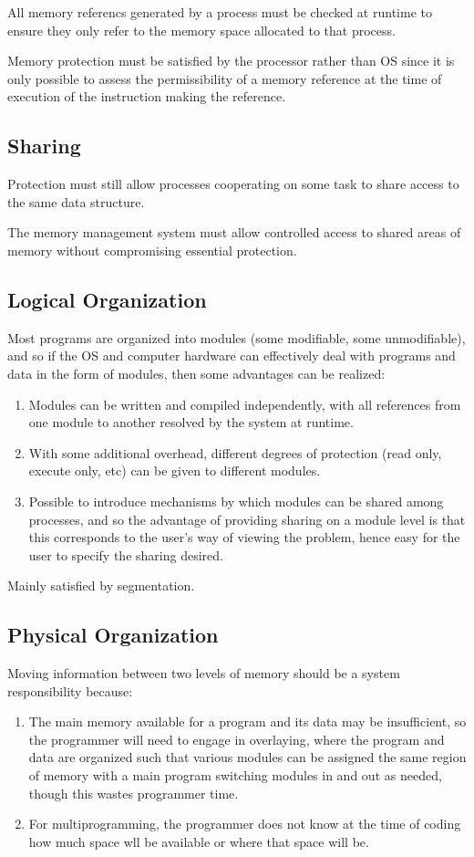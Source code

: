\documentclass[11pt]{article}
\begin{document}
All memory referencs generated by a process must be checked at runtime to ensure
they only refer to the memory space allocated to that process.

Memory protection must be satisfied by the processor rather than OS since it is
only possible to assess the permissibility of a memory reference at the time of
execution of the instruction making the reference.
\subsection{Sharing}
\label{sec:org9877cf6}
Protection must still allow processes cooperating on some task to share access to the
same data structure.

The memory management system must allow controlled access to shared areas of memory
without compromising essential protection.
\subsection{Logical Organization}
\label{sec:org0d402cc}
Most programs are organized into modules (some modifiable, some unmodifiable), and so
if the OS and computer hardware can effectively deal with programs and data in the
form of modules, then some advantages can be realized:
\begin{enumerate}
\item Modules can be written and compiled independently, with all references from one
module to another resolved by the system at runtime.
\item With some additional overhead, different degrees of protection (read only, execute
only, etc) can be given to different modules.
\item Possible to introduce mechanisms by which modules can be shared among processes,
and so the advantage of providing sharing on a module level is that this corresponds
to the user's way of viewing the problem, hence easy for the user to specify the
sharing desired.
\end{enumerate}

Mainly satisfied by segmentation.
\subsection{Physical Organization}
\label{sec:org888ccc9}
Moving information between two levels of memory should be a system responsibility
because:
\begin{enumerate}
\item The main memory available for a program and its data may be insufficient, so the
programmer will need to engage in overlaying, where the program and data are
organized such that various modules can be assigned the same region of memory
with a main program switching modules in and out as needed, though this wastes
programmer time.
\item For multiprogramming, the programmer does not know at the time of coding how much
space wll be available or where that space will be.
\end{enumerate}
\end{document}
